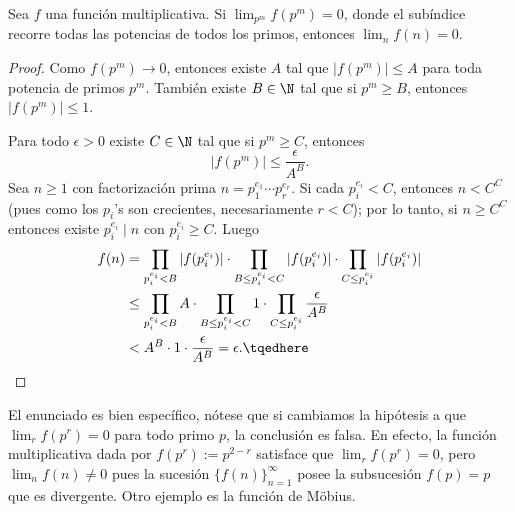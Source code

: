 \documentclass[teoria-numeros.tex]{subfiles}
\begin{document}

\begin{lem}
	Sea $f$ una función multiplicativa.
	Si $\lim_{p^m} f(p^m) = 0$, donde el subíndice recorre todas las potencias de todos los primos, entonces $\lim_n f(n) = 0$.
\end{lem}
\begin{proof}
	Como $f(p^m) \to 0$, entonces existe $A$ tal que $|f(p^m)| \le A$ para toda potencia de primos $p^m$.
	También existe $B \in \N$ tal que si $p^m \ge B$, entonces $|f(p^m)| \le 1$.

	Para todo $\epsilon > 0$ existe $C \in \N$ tal que si $p^m \ge C$, entonces
	$$ |f(p^m)| \le \frac{\epsilon}{A^B}. $$
	Sea $n \ge 1$ con factorización prima $n = p_1^{e_1} \cdots p_r^{e_r}$.
	Si cada $p_i^{e_i} < C$, entonces $n < C^C$ (pues como los $p_i$'s son crecientes, necesariamente $r < C$);
	por lo tanto, si $n \ge C^C$ entonces existe $p_i^{e_i} \mid n$ con $p_i^{e_i} \ge C$.
	Luego
	\begin{align}
		f(n) &=   \prod_{p_i^{e_i} < B} |f(p_i^{e_i})| \cdot \prod_{B \le p_i^{e_i} < C} |f(p_i^{e_i})|
		     \cdot \prod_{C \le p_i^{e_i}} |f(p_i^{e_i})| \notag \\
		     &\le \prod_{p_i^{e_i} < B} A              \cdot \prod_{B \le p_i^{e_i} < C} 1
		     \cdot \prod_{C \le p_i^{e_i}} \frac{\epsilon}{A^B} \notag \\
		     &<    A^B \cdot 1 \cdot \frac{\epsilon}{A^B} = \epsilon. \tqedhere
	\end{align}
\end{proof}

\warn
El enunciado es bien específico, nótese que si cambiamos la hipótesis a que $\lim_r f(p^r) = 0$ para todo primo $p$,
la conclusión es falsa.
En efecto, la función multiplicativa dada por $f(p^r) := p^{2 - r}$ satisface que $\lim_r f(p^r) = 0$, pero $\lim_n f(n) \ne 0$
pues la sucesión $\{ f(n) \}_{n = 1}^\infty$ posee la subsucesión $f(p) = p$ que es divergente.
Otro ejemplo es la función de Möbius.
\end{document}
